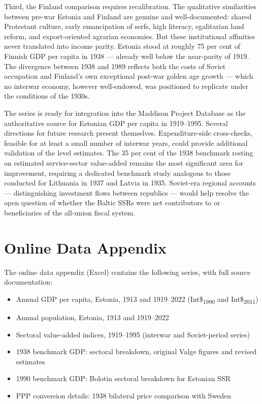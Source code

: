\documentclass[12pt,a4paper]{article}
\newcommand{\intlnineteen}{Int\$\textsubscript{1990}}   %
\newcommand{\intltwenty}{Int\$\textsubscript{2011}}     %
\begin{document}
Third, the Finland comparison requires recalibration. The qualitative similarities between pre-war Estonia and Finland are genuine and well-documented: shared Protestant culture, early emancipation of serfs, high literacy, egalitarian land reform, and export-oriented agrarian economies. But these institutional affinities never translated into income parity. Estonia stood at roughly 75 per cent of Finnish GDP per capita in 1938 — already well below the near-parity of 1919. The divergence between 1938 and 1989 reflects both the costs of Soviet occupation and Finland's own exceptional post-war golden age growth — which no interwar economy, however well-endowed, was positioned to replicate under the conditions of the 1930s.

The series is ready for integration into the Maddison Project Database as the authoritative source for Estonian GDP per capita in 1919--1995. Several directions for future research present themselves. Expenditure-side cross-checks, feasible for at least a small number of interwar years, could provide additional validation of the level estimates. The 35 per cent of the 1938 benchmark resting on estimated service-sector value-added remains the most significant area for improvement, requiring a dedicated benchmark study analogous to those conducted for Lithuania in 1937 and Latvia in 1935. Soviet-era regional accounts — distinguishing investment flows between republics — would help resolve the open question of whether the Baltic SSRs were net contributors to or beneficiaries of the all-union fiscal system.

\newpage
{\sloppy\printbibliography}

\newpage
\section*{Online Data Appendix}

The online data appendix (Excel) contains the following series, with full source documentation:
\begin{itemize}
    \item Annual GDP per capita, Estonia, 1913 and 1919--2022 (\intlnineteen{} and \intltwenty{})
    \item Annual population, Estonia, 1913 and 1919--2022
    \item Sectoral value-added indices, 1919--1995 (interwar and Soviet-period series)
    \item 1938 benchmark GDP: sectoral breakdown, original Valge figures and revised estimates
    \item 1990 benchmark GDP: Bolotin sectoral breakdown for Estonian SSR
    \item PPP conversion details: 1938 bilateral price comparison with Sweden
\end{itemize}
\end{document}
